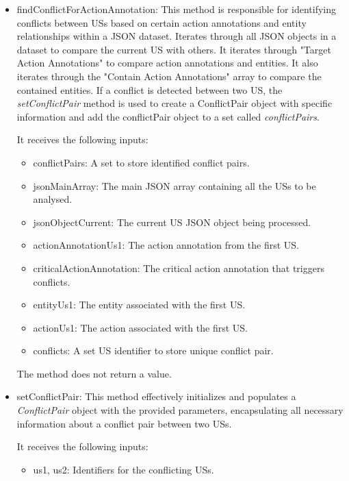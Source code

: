 \begin{itemize}
	\item findConflictForActionAnnotation: This method is responsible for identifying conflicts between USs based on certain action annotations and entity relationships within a JSON dataset. Iterates through all JSON objects in a dataset to compare the current US with others. It iterates through "Target Action Annotations" to compare action annotations and entities. It also iterates through the "Contain Action Annotations" array to compare the contained entities. If a conflict is detected between two US, the \textit{setConflictPair} method is used to create a ConflictPair object with specific information and add the conflictPair object to a set called \textit{conflictPairs}.
	
	It receives the following inputs:
	\begin{itemize}
		
		\item conflictPairs: A set to store identified conflict pairs.
		 
		\item jsonMainArray: The main JSON array containing all the USs to be analysed.
		
		\item jsonObjectCurrent: The current US JSON object being processed.
		
		\item actionAnnotationUs1: The action annotation from the first US.
		
		\item criticalActionAnnotation: The critical action annotation that triggers conflicts.
		
		\item entityUs1: The entity associated with the first US.
		
		\item actionUs1: The action associated with the first US.
		
		\item conflicts: A set US identifier to store unique conflict pair.		
		
	\end{itemize}
	The method does not return a value.
	
	\item setConflictPair: This method effectively initializes and populates a \textit{ConflictPair} object with the provided parameters, encapsulating all necessary information about a conflict pair between two USs.
	
	It receives the following inputs:
	\begin{itemize}
		\item us1, us2: Identifiers for the conflicting USs.
		

\end{itemize}
\end{itemize}
